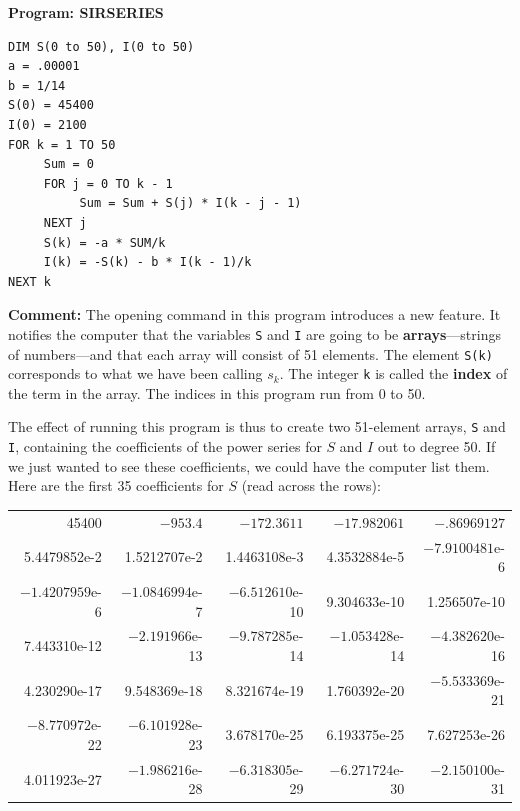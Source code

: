 {{{{\begin{center}

{\bf Program: SIRSERIES}
\end{center}
\noindent
\vspace*{-30pt}
\begin{verbatim}
DIM S(0 to 50), I(0 to 50)
a = .00001
b = 1/14
S(0) = 45400
I(0) = 2100
FOR k = 1 TO 50
     Sum = 0
     FOR j = 0 TO k - 1
          Sum = Sum + S(j) * I(k - j - 1)
     NEXT j
     S(k) = -a * SUM/k
     I(k) = -S(k) - b * I(k - 1)/k
NEXT k
\end{verbatim}




{\bf Comment:}  The opening command in this program introduces a new feature. It notifies the computer that the variables {\tt S} and {\tt I} are going to be {\bf arrays}---strings of numbers---and that each array will consist of 51 elements.  The element {\tt S(k)} corresponds to what we have been calling $s_k$.  The integer {\tt k} is called the {\bf index} of the term in the array.  The indices in this program run from 0 to 50.

The effect of running this program is thus to create two 51-element arrays, {\tt S} and {\tt I}, containing the coefficients of the power series for $S$ and $I$ out to degree 50.  If we just wanted to see these coefficients, we could have the computer list them.  Here are the first 35 coefficients for $S$ (read across the rows):
\vspace{12pt}

\begin{small}
\hspace{-60pt}


\begin{tabular}{rrrrr}
45400    &    $-953.4$  &  $-172.3611$   &  $-17.982061$  &  $-.86969127$ \\
5.4479852e-2 & 1.5212707e-2 &1.4463108e-3  &  4.3532884e-5 &$-7.9100481$e-6\\
$-1.4207959$e-6&$-1.0846994$e-7&$-6.512610$e-10 &9.304633e-10 &1.256507e-10 \\
7.443310e-12&$-2.191966$e-13&$-9.787285$e-14&$-1.053428$e-14&$-4.382620$e-16\\
4.230290e-17 & 9.548369e-18 & 8.321674e-19 & 1.760392e-20  & $-5.533369$e-21\\
$-8.770972$e-22&$-6.101928$e-23&3.678170e-25& 6.193375e-25  & 7.627253e-26 \\ 4.011923e-27&$-1.986216$e-28&$-6.318305$e-29&$-6.271724$e-30&$-2.150100$e-31 \\ \end{tabular}
\end{small}

}}}}
